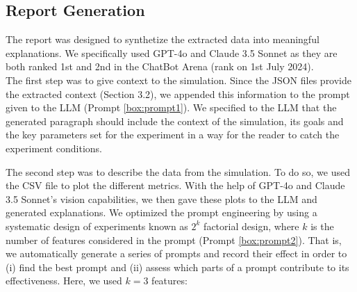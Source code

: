 \documentclass[preprint,12pt]{elsarticle}
\begin{document}
\subsection{Report Generation}
\label{subsec3}


The report was designed to synthetize the extracted data into meaningful explanations. We specifically used GPT-4o and Claude 3.5 Sonnet as they are both ranked 1st and 2nd in the ChatBot Arena \cite{ChatLM2024} (rank on 1st July 2024).\\

The first step was to give context to the simulation. Since the JSON files provide the extracted context  (Section 3.2), we appended this information to the prompt given to the LLM (Prompt \ref{box:prompt1}). We specified to the LLM that the generated paragraph should include the context of the simulation, its goals and the key parameters set for the experiment in a way for the reader to catch the experiment conditions.

The second step was to describe the data from the simulation. To do so, we used the CSV file to plot the different metrics. With the help of GPT-4o and Claude 3.5 Sonnet's vision capabilities, we then gave these plots to the LLM and generated  explanations. We optimized the prompt engineering by using a systematic design of experiments known as $2^k$ factorial design, where $k$ is the number of features considered in the prompt (Prompt \ref{box:prompt2}). That is, we automatically generate a series of prompts and record their effect in order to (i) find the best prompt and (ii) assess which parts of a prompt contribute to its effectiveness. Here, we used $k=3$ features:\\
\end{document}
